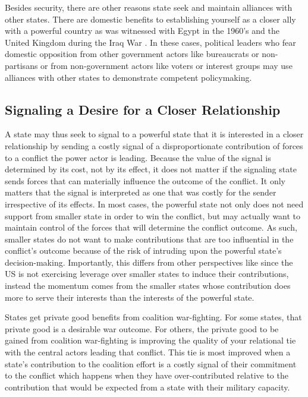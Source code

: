 \documentclass[12pt,letterpaper]{article}
\begin{document}
		Besides security, there are other reasons state seek and maintain alliances with other states. There are domestic benefits to establishing yourself as a closer ally with a powerful country as was witnessed with Egypt in the 1960's \citep{barnett_domesticsourcesalliances_1991} and the United Kingdom during the Iraq War \citep{davidson_americaallieswar_2011}. In these cases, political leaders who fear domestic opposition from other government actors like bureaucrats or non-partisans or from non-government actors like voters or interest groups may use alliances with other states to demonstrate competent policymaking.

	\subsection{Signaling a Desire for a Closer Relationship}
		A state may thus seek to signal to a powerful state that it is interested in a closer relationship by sending a costly signal of a disproportionate contribution of forces to a conflict the power actor is leading. Because the value of the signal is determined by its cost, not by its effect, it does not matter if the signaling state sends forces that can materially influence the outcome of the conflict. It only matters that the signal is interpreted as one that was costly for the sender irrespective of its effects. In most cases, the powerful state not only does not need support from smaller state in order to win the conflict, but may actually want to maintain control of the forces that will determine the conflict outcome. As such, smaller states do not want to make contributions that are too influential in the conflict's outcome because of the risk of intruding upon the powerful state's decision-making. Importantly, this differs from other perspectives like \citet{bennett_burdensharingpersiangulf_1994} since the US is not exercising leverage over smaller states to induce their contributions, instead the momentum comes from the smaller states whose contribution does more to serve their interests than the interests of the powerful state.

		States get private good benefits from coalition war-fighting. For some states, that private good is a desirable war outcome.  For others, the private good to be gained from coalition war-fighting is improving the quality of your relational tie with the central actors leading that conflict. This tie is most improved when a state's contribution to the coalition effort is a costly signal of their commitment to the conflict which happens when they have over-contributed relative to the contribution that would be expected from a state with their military capacity.
\end{document}
